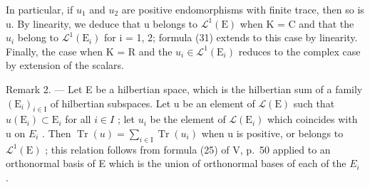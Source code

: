In particular, if \(u_{1}\) and \(u_{2}\) are positive endomorphisms with finite trace, then so is u. By linearity, we deduce that u belongs to \(\mathcal{L}^{1}(\mathrm{E})\) when K = C and that the \(u_{i}\) belong to \(\mathcal{L}^{1}(\mathrm{E}_{i})\) for i = 1, 2; formula (31) extends to this case by linearity. Finally, the case when K = R and the \(u_{i} \in \mathcal{L}^{1}(\mathrm{E}_{i})\) reduces to the complex case by extension of the scalars.

Remark 2. --- Let E be a hilbertian space, which is the hilbertian sum of a family \((\mathrm{E}_{i})_{i\in\mathrm{I}}\) of hilbertian subspaces. Let u be an element of \(\mathcal{L}(\mathrm{E})\) such that \(u(\mathrm{E}_{i}) \subset \mathrm{E}_{i}\) for all \(i \in I\) ; let \(u_{i}\) be the element of \(\mathcal{L}(\mathrm{E}_{i})\) which coincides with u on \(E_{i}\) . Then \(\operatorname{Tr}(u) = \sum_{i \in \mathrm{I}} \operatorname{Tr}(u_{i})\) when u is positive, or belongs to \(\mathcal{L}^{1}(\mathrm{E})\) ; this relation follows from formula (25) of V, p.~50 applied to an orthonormal basis of E which is the union of orthonormal bases of each of the \(E_{i}\) .

